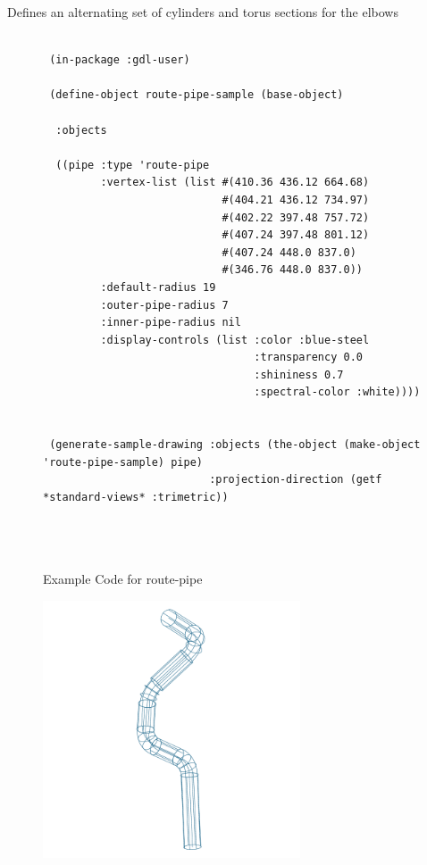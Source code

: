 \documentclass [11pt]{book}
\begin{document}
\begin{itemize}
\begin{description}
Defines an alternating set of cylinders and torus sections for the elbows



\end{description}




\begin{figure}
\begin{lrbox}{\boxedverb}
\begin{minipage}{\linewidth}
{\small

\begin{verbatim}

 (in-package :gdl-user)  

 (define-object route-pipe-sample (base-object)

  :objects

  ((pipe :type 'route-pipe
         :vertex-list (list #(410.36 436.12 664.68) 
                            #(404.21 436.12 734.97) 
                            #(402.22 397.48 757.72) 
                            #(407.24 397.48 801.12) 
                            #(407.24 448.0 837.0)
                            #(346.76 448.0 837.0))
         :default-radius 19
         :outer-pipe-radius 7
         :inner-pipe-radius nil
         :display-controls (list :color :blue-steel 
                                 :transparency 0.0 
                                 :shininess 0.7 
                                 :spectral-color :white))))

 
 (generate-sample-drawing :objects (the-object (make-object 'route-pipe-sample) pipe)
                          :projection-direction (getf *standard-views* :trimetric))
  



\end{verbatim}}
\end{minipage}
\end{lrbox}
\fbox{\usebox{\boxedverb}}

\caption{Example Code for route-pipe}

\label{fig:example-code-route-pipe}

\end{figure}

\begin{figure}
\begin{center}
\includegraphics[width=3in,height=3in]{../images/example-route-pipe.pdf}
\end{center}


\end{figure}
\end{itemize}
\end{document}
